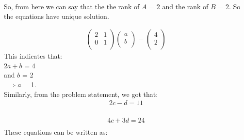 So, from here we can say that the the rank of $A$ = 2 and the rank of $B$ = 2.
So the equations have unique solution.

\begin{equation}
\begin{aligned}
      \begin{pmatrix}
      2       & 1\\ 
      0       & 1\\
            
    \end{pmatrix} \begin{pmatrix}
      a\\ 
      b\\
            
    \end{pmatrix} = \begin{pmatrix}
      4\\ 
      2\\
            
    \end{pmatrix} 
\end{aligned}
\end{equation}
This indicates that:\\
$2a+b$ = 4\\
and $b$ = 2\\
$\implies  a$ = 1.\\

Similarly, from the problem statement, we got that:\\

\begin{equation}
\begin{aligned}
2c-d=11\\
\end{aligned}
\end{equation}

\begin{equation}
\begin{aligned}
4c+3d=24\\
\end{aligned}
\end{equation}
These equations can be written as:\\

